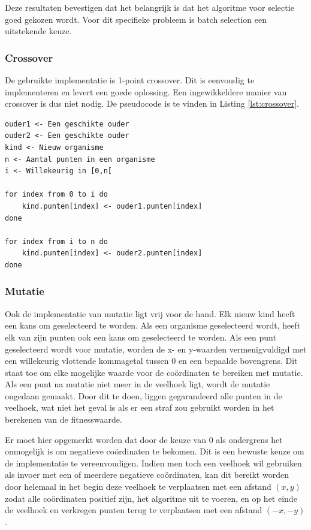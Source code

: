 \documentclass[titlepage,a4paper]{article}
\begin{document}
Deze resultaten bevestigen dat het belangrijk is dat het algoritme voor selectie goed gekozen wordt. Voor dit specifieke probleem is batch selection een uitstekende keuze.

\subsubsection{Crossover}
De gebruikte implementatie is 1-point crossover. Dit is eenvoudig te implementeren en levert een goede oplossing. Een ingewikkeldere manier van crossover is dus niet nodig. De pseudocode is te vinden in Listing \ref{lst:crossover}.
\begin{lstlisting}[caption={1-point crossover},label={lst:crossover}]
ouder1 <- Een geschikte ouder
ouder2 <- Een geschikte ouder
kind <- Nieuw organisme
n <- Aantal punten in een organisme
i <- Willekeurig in [0,n[

for index from 0 to i do
    kind.punten[index] <- ouder1.punten[index]
done

for index from i to n do
    kind.punten[index] <- ouder2.punten[index]
done
\end{lstlisting}
\subsubsection{Mutatie}
Ook de implementatie van mutatie ligt vrij voor de hand. Elk nieuw kind heeft een kans om geselecteerd te worden. Als een organisme geselecteerd wordt, heeft elk van zijn punten ook een kans om geselecteerd te worden. Als een punt geselecteerd wordt voor mutatie, worden de x- en y-waarden vermenigvuldigd met een willekeurig vlottende kommagetal tussen $0$ en een bepaalde bovengrens. Dit staat toe om elke mogelijke waarde voor de co\"ordinaten te bereiken met mutatie. Als een punt na mutatie niet meer in de veelhoek ligt, wordt de mutatie ongedaan gemaakt. Door dit te doen, liggen gegarandeerd alle punten in de veelhoek, wat niet het geval is als er een straf zou gebruikt worden in het berekenen van de fitnesswaarde.

Er moet hier opgemerkt worden dat door de keuze van $0$ als ondergrens het onmogelijk is om negatieve co\"ordinaten te bekomen. Dit is een bewuste keuze om de implementatie te vereenvoudigen. Indien men toch een veelhoek wil gebruiken als invoer met een of meerdere negatieve co\"ordinaten, kan dit bereikt worden door helemaal in het begin deze veelhoek te verplaatsen met een afstand $(x,y)$ zodat alle co\"ordinaten positief zijn, het algoritme uit te voeren, en op het einde de veelhoek en verkregen punten terug te verplaatsen met een afstand $(-x,-y)$.
\end{document}
